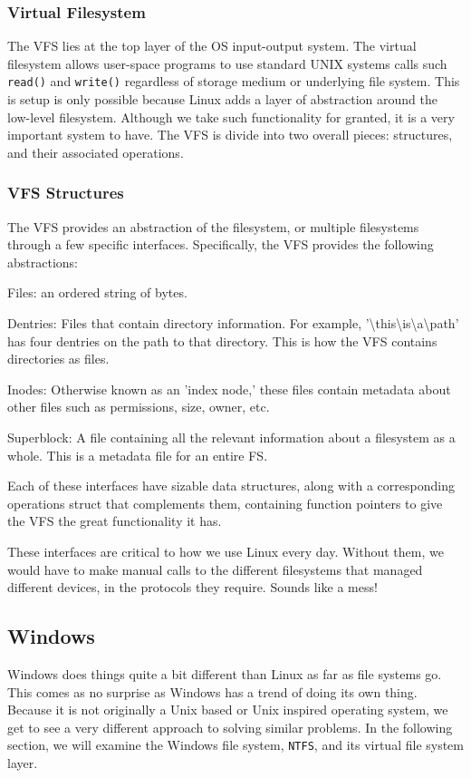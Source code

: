 \documentclass[10pt,letterpaper,onecolumn,draftclsnofoot]{IEEEtran}
\begin{document}
\subsubsection{Virtual Filesystem}
The VFS lies at the top layer of the OS input-output system. The virtual
filesystem allows user-space programs to use standard UNIX systems calls
such \texttt{read()} and \texttt{write()} regardless of storage medium or
underlying file system. This is setup is only possible because Linux adds
a layer of abstraction around the low-level filesystem. Although we take
such functionality for granted, it is a very important system to have.
The VFS is divide into two overall pieces: structures, and their associated
operations. \cite{robertlove2010}

\subsubsection{VFS Structures}
The VFS provides an abstraction of the filesystem, or multiple filesystems
through a few specific interfaces. Specifically, the VFS provides the
following abstractions:
\begin{description}
	\item Files: an ordered string of bytes.
	\item Dentries: Files that contain directory information. For example,
	'\textbackslash this\textbackslash is\textbackslash a\textbackslash path'
	has four dentries on the path to that directory. This is how the VFS contains
	directories as files.
	\item Inodes: Otherwise known as an 'index node,' these files contain metadata
	about other files such as permissions, size, owner, etc.
	\item Superblock: A file containing all the relevant information about a filesystem
	as a whole. This is a metadata file for an entire FS.
\end{description}

Each of these interfaces have sizable data structures, along with a corresponding
operations struct that complements them, containing function pointers to give the
VFS the great functionality it has.\cite{robertlove2010}

These interfaces are critical to how we use Linux every day. Without them, we
would have to make manual calls to the different filesystems that managed different
devices, in the protocols they require. Sounds like a mess!

\subsection{Windows}
Windows does things quite a bit different than Linux as far as file systems go.
This comes as no surprise as Windows has a trend of doing its own thing. Because
it is not originally a Unix based or Unix inspired operating system, we get to
see a very different approach to solving similar problems. In the following
section, we will examine the Windows file system, \texttt{NTFS}, and its virtual
file system layer.
\end{document}
